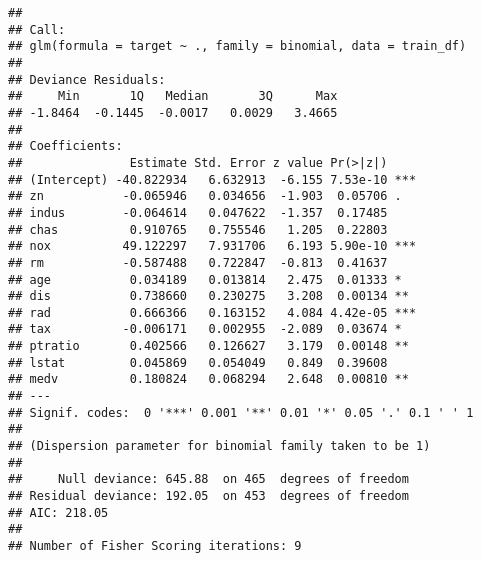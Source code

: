 \documentclass[
]{article}
\newenvironment{Shaded}{\begin{snugshade}}{\end{snugshade}}
\newcommand{\AttributeTok}[1]{\textcolor[rgb]{0.77,0.63,0.00}{#1}}
\newcommand{\CommentTok}[1]{\textcolor[rgb]{0.56,0.35,0.01}{\textit{#1}}}
\newcommand{\DecValTok}[1]{\textcolor[rgb]{0.00,0.00,0.81}{#1}}
\newcommand{\FloatTok}[1]{\textcolor[rgb]{0.00,0.00,0.81}{#1}}
\newcommand{\FunctionTok}[1]{\textcolor[rgb]{0.00,0.00,0.00}{#1}}
\newcommand{\NormalTok}[1]{#1}
\newcommand{\OtherTok}[1]{\textcolor[rgb]{0.56,0.35,0.01}{#1}}
\newcommand{\SpecialCharTok}[1]{\textcolor[rgb]{0.00,0.00,0.00}{#1}}
\newcommand{\StringTok}[1]{\textcolor[rgb]{0.31,0.60,0.02}{#1}}
\begin{document}
\begin{verbatim}
## 
## Call:
## glm(formula = target ~ ., family = binomial, data = train_df)
## 
## Deviance Residuals: 
##     Min       1Q   Median       3Q      Max  
## -1.8464  -0.1445  -0.0017   0.0029   3.4665  
## 
## Coefficients:
##               Estimate Std. Error z value Pr(>|z|)    
## (Intercept) -40.822934   6.632913  -6.155 7.53e-10 ***
## zn           -0.065946   0.034656  -1.903  0.05706 .  
## indus        -0.064614   0.047622  -1.357  0.17485    
## chas          0.910765   0.755546   1.205  0.22803    
## nox          49.122297   7.931706   6.193 5.90e-10 ***
## rm           -0.587488   0.722847  -0.813  0.41637    
## age           0.034189   0.013814   2.475  0.01333 *  
## dis           0.738660   0.230275   3.208  0.00134 ** 
## rad           0.666366   0.163152   4.084 4.42e-05 ***
## tax          -0.006171   0.002955  -2.089  0.03674 *  
## ptratio       0.402566   0.126627   3.179  0.00148 ** 
## lstat         0.045869   0.054049   0.849  0.39608    
## medv          0.180824   0.068294   2.648  0.00810 ** 
## ---
## Signif. codes:  0 '***' 0.001 '**' 0.01 '*' 0.05 '.' 0.1 ' ' 1
## 
## (Dispersion parameter for binomial family taken to be 1)
## 
##     Null deviance: 645.88  on 465  degrees of freedom
## Residual deviance: 192.05  on 453  degrees of freedom
## AIC: 218.05
## 
## Number of Fisher Scoring iterations: 9
\end{verbatim}

\begin{Shaded}
\end{Shaded}
\end{document}
